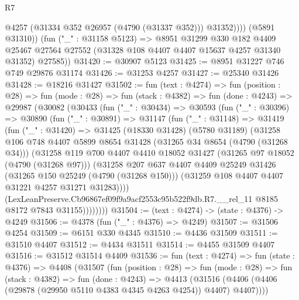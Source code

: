\begin{lexlean}{R7}
\begin{coremodule}
                @4257
                (@31334 @352 @26957 (@4790 (@31337 @352)))
                @31352))))
        (@5891 @31310))
      (fun ("_" : @31158 @5123) =>
      @8951
        @31299
        @330
        @182
        @4409
        @25467
        @27564
        @27552
        (@31328 @108 @4407 @4407 @15637 @4257 @31340 @31352)
        @27585))
@31420 := @30907 @5123
@31425 := @8951 @31227 @746 @749 @29876 @31174
@31426 := @31253 @4257
@31427 := @25340 @31426
@31428 := @18216 @31427
@31502 := fun (text : @4274) =>
  fun (position : @28) =>
  fun (mode : @28) =>
  fun (stack : @4382) =>
  fun (done : @4243) =>
  @29987
    (@30082
      (@30433
        (fun ("_" : @30434) =>
        @30593
          (fun ("_" : @30396) =>
          @30890
            (fun ("_" : @30891) =>
            @31147
              (fun ("_" : @31148) =>
              @31419
                (fun ("_" : @31420) =>
                @31425
                  (@18330 @31428)
                  (@5780 @31189)
                  (@31258
                    @106
                    @748
                    @4407
                    @5899
                    @8654
                    @31428
                    (@31265 @34 @8654 (@4790 (@31268 @34)))
                    (@31258
                      @119
                      @700
                      @4407
                      @4410
                      @18052
                      @31427
                      (@31265 @97 @18052 (@4790 (@31268 @97)))
                      (@31258
                        @207
                        @637
                        @4407
                        @4409
                        @25249
                        @31426
                        (@31265 @150 @25249 (@4790 (@31268 @150)))
                        (@31259 @108 @4407 @4407 @31221 @4257 @31271 @31283))))
                  (LexLeanPreserve.Cb96867ef09f9a9acf2553c95b522f9db.R7.__rel_11
                    @8185
                    @8172
                    @7843
                    @31155))))))))
@31504 := (text : @4274) -> (state : @4376) -> @4249
@31506 := @4378 (fun ("_" : @4376) => @4249)
@31507 := @31506 @4254
@31509 := @6151 @330 @4345
@31510 := @4436 @31509
@31511 := @31510 @4407
@31512 := @4434 @31511
@31514 := @4455 @31509 @4407
@31516 := @31512 @31514 @4409
@31536 := fun (text : @4274) =>
  fun (state : @4376) =>
  @4408
    (@31507
      (fun (position : @28) =>
      fun (mode : @28) =>
      fun (stack : @4382) =>
      fun (done : @4243) =>
      @4413 (@31516 (@4406 (@4406 (@29878 (@29950 @5110 @4383 @4345 @4263 @4254)) @4407) @4407))))

\end{coremodule}
\end{lexlean}
